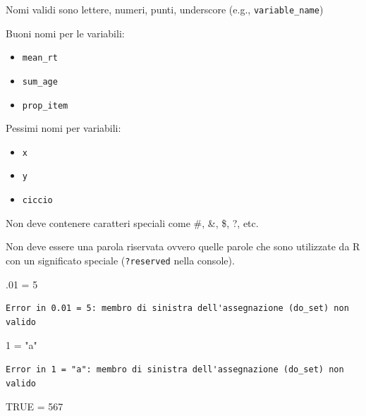 \documentclass[
  a4paper,
  DIV=11,
  numbers=noendperiod]{scrreprt}
\newenvironment{Shaded}{\begin{snugshade}}{\end{snugshade}}
\newcommand{\ConstantTok}[1]{\textcolor[rgb]{0.56,0.35,0.01}{#1}}
\newcommand{\DecValTok}[1]{\textcolor[rgb]{0.00,0.00,0.81}{#1}}
\newcommand{\NormalTok}[1]{#1}
\newcommand{\OtherTok}[1]{\textcolor[rgb]{0.56,0.35,0.01}{#1}}
\newcommand{\StringTok}[1]{\textcolor[rgb]{0.31,0.60,0.02}{#1}}
\begin{document}
Nomi validi sono lettere, numeri, punti, underscore (e.g.,
\texttt{variable\_name})

Buoni nomi per le variabili:

\begin{itemize}
\item
  \texttt{mean\_rt}
\item
  \texttt{sum\_age}
\item
  \texttt{prop\_item}
\end{itemize}

Pessimi nomi per variabili:

\begin{itemize}
\item
  \texttt{x}
\item
  \texttt{y}
\item
  \texttt{ciccio}
\end{itemize}

Non deve contenere caratteri speciali come \#, \&, \$, ?, etc.

Non deve essere una parola riservata ovvero quelle parole che sono
utilizzate da R con un significato speciale (\texttt{?reserved} nella
console).

\begin{Shaded}
\begin{Highlighting}[]
\NormalTok{.}\DecValTok{01} \OtherTok{=} \DecValTok{5}
\end{Highlighting}
\end{Shaded}

\begin{verbatim}
Error in 0.01 = 5: membro di sinistra dell'assegnazione (do_set) non valido
\end{verbatim}

\begin{Shaded}
\begin{Highlighting}[]
\DecValTok{1} \OtherTok{=} \StringTok{"a"}
\end{Highlighting}
\end{Shaded}

\begin{verbatim}
Error in 1 = "a": membro di sinistra dell'assegnazione (do_set) non valido
\end{verbatim}

\begin{Shaded}
\begin{Highlighting}[]
\ConstantTok{TRUE} \OtherTok{=} \DecValTok{567}
\end{Highlighting}
\end{Shaded}
\end{document}
